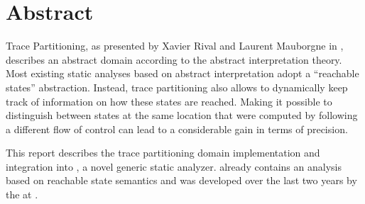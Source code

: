 %

\chapter*{Abstract}
	\label{Abstract}

	Trace Partitioning, as presented by Xavier Rival and Laurent Mauborgne in \cite{mauborgne:rival05}, describes an abstract domain according to the abstract interpretation theory. Most existing static analyses based on abstract interpretation adopt a ``reachable states'' abstraction. Instead, trace partitioning also allows to dynamically keep track of information on how these states are reached. Making it possible to distinguish between states at the same location that were computed by following a different flow of control can lead to a considerable gain in terms of precision.

	This report describes the trace partitioning domain implementation and integration into \sample, a novel generic static analyzer. \sample already contains an analysis based on reachable state semantics and was developed over the last two years by the \copm at \ethz. 
